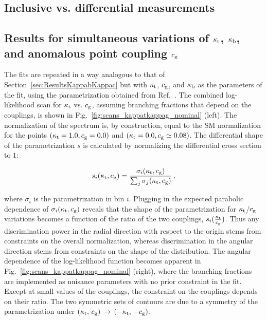 \subsection{Inclusive vs. differential measurements}



\subsection{Results for simultaneous variations of \texorpdfstring{$\kappa_{\mathrm{t}}$}{kt}, \texorpdfstring{$\kappa_{\mathrm{b}}$}{kb}, and anomalous point coupling \texorpdfstring{$c_\mathrm{g}$}{cg}}


The fits are repeated in a way analogous to that of Section~\ref{sec:ResultsKappabKappac} but with $\kappa_{\mathrm{t}}$, $c_\mathrm{g}$, and $\kappa_{\mathrm{b}}$ as the parameters of the fit, using the parametrization obtained from Ref.~\cite{Grazzini:2017szg}.
% 
The combined log-likelihood scan for $\kappa_{\mathrm{t}}$ vs. $c_\mathrm{g}$, assuming branching fractions that depend on the couplings, is shown in Fig.~\ref{fig:scans_kappatkappag_nominal} (left).
% 
The normalization of the spectrum is, by construction, equal to the SM normalization for the points $( \kappa_{\mathrm{t}} = 1.0, c_\mathrm{g} = 0.0 )$ and $( \kappa_{\mathrm{t}} = 0.0, c_\mathrm{g} \simeq 0.08 )$.
% 
The differential shape of the parametrization $s$ is calculated by normalizing the differential cross section to $1$:
% 
\begin{linenomath*}
\begin{equation}
    s_i(\kappa_{\mathrm{t}}, c_\mathrm{g}) =
        \frac
            {\sigma_i(\kappa_{\mathrm{t}}, c_\mathrm{g})}
            {\sum_j \sigma_j(\kappa_{\mathrm{t}}, c_\mathrm{g})}
    \,,
\end{equation}
\end{linenomath*}
% 
where $\sigma_i$ is the parametrization in bin $i$.
% 
Plugging in the expected parabolic dependence of $\sigma_i(\kappa_{\mathrm{t}}, c_\mathrm{g})$
% 
reveals that the shape of the parametrization for $\kappa_{\mathrm{t}}$/$c_\mathrm{g}$ variations becomes a function of the ratio of the two couplings, $s_i(\frac{\kappa_{\mathrm{t}}}{c_\mathrm{g}})$.
% 
Thus any discrimination power in the radial direction with respect to the origin stems from constraints on the overall normalization, whereas discrimination in the angular direction stems from constraints on the shape of the distribution.
% 
The angular dependence of the log-likelihood function becomes apparent in Fig.~\ref{fig:scans_kappatkappag_nominal} (right), where the branching fractions are implemented as nuisance parameters with no prior constraint in the fit.
% 
Except at small values of the couplings, the constraint on the couplings depends on their ratio.
% 
The two symmetric sets of contours are due to a symmetry of the parametrization under $(\kappa_{\mathrm{t}},\,c_\mathrm{g}) \, \to \, (-\kappa_{\mathrm{t}},\,-c_\mathrm{g})$.


